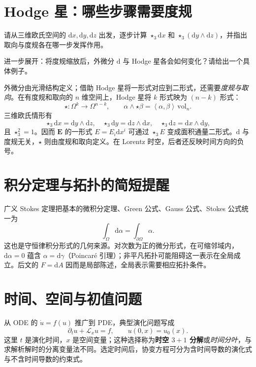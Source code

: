 \documentclass[UTF8,11pt,openany]{ctexbook}
\numberwithin{equation}{chapter}
\theoremstyle{definition}
\theoremstyle{remark}
\newcommand{\dd}{\mathrm d}
\newcommand{\vol}{\mathrm{vol}}
\newcommand{\starS}{\star_3}
\newcommand{\ip}[2]{\left\langle #1,#2\right\rangle}
\begin{document}
\section{Hodge 星：哪些步骤需要度规}
\begin{askai}
请从三维欧氏空间的 $\dd x,\dd y,\dd z$ 出发，逐步计算 $\starS\dd x$ 和 $\starS(\dd y\wedge\dd z)$，并指出取向与度规各在哪一步发挥作用。

进一步展开：将度规缩放后，外微分 $\dd$ 与 Hodge 星各会如何变化？请给出一个具体例子。
\end{askai}
外微分由光滑结构定义；借助 Hodge 星将一形式对应到二形式，还需要\emph{度规与取向}。在有度规和取向的 $n$ 维空间上，Hodge 星将 $k$ 形式映为 $(n-k)$ 形式：
\begin{equation}
\star:\Omega^k\to\Omega^{n-k},\qquad
\alpha\wedge\star\beta=\ip{\alpha}{\beta}\,\vol_n.
\end{equation}
三维欧氏情形有
\begin{equation}
\starS\dd x=\dd y\wedge\dd z,\quad
\starS\dd y=\dd z\wedge\dd x,\quad
\starS\dd z=\dd x\wedge\dd y,
\end{equation}
且 $\starS^2=1$。因而 $\bm E$ 的一形式 $E=E_i\dd x^i$ 可通过 $\starS E$ 变成面积通量二形式。$\dd$ 与度规无关，$\star$ 则由度规和取向定义。在 Lorentz 时空，后者还反映时间方向的负号。

\section{积分定理与拓扑的简短提醒}
广义 Stokes 定理把基本的微积分定理、Green 公式、Gauss 公式、Stokes 公式统一为
\begin{equation}\label{eq:stokes}
\int_\Omega\dd\alpha=\int_{\partial\Omega}\alpha.
\end{equation}
这也是守恒律积分形式的几何来源。对次数为正的微分形式，在可缩邻域内，$\dd\alpha=0$ 蕴含 $\alpha=\dd\gamma$（Poincar\'e 引理）；非平凡拓扑可能阻碍这一表示在全局成立。后文的 $F=\dd A$ 因而是局部陈述，全局表示需要相应拓扑条件。

\section{时间、空间与初值问题}
从 ODE 的 $\dot u=f(u)$ 推广到 PDE，典型演化问题写成
\begin{equation}
\partial_t u+\mathcal L_xu=f,\qquad u(0,x)=u_0(x).
\end{equation}
这里 $t$ 是演化时间，$x$ 是空间变量；这种选择称为\textbf{时空 $3+1$ 分解}或\emph{时间分叶}，与求解析解时的分离变量法不同。选定时间后，协变方程可分为含时间导数的演化式与不含时间导数的约束式。
\end{document}
